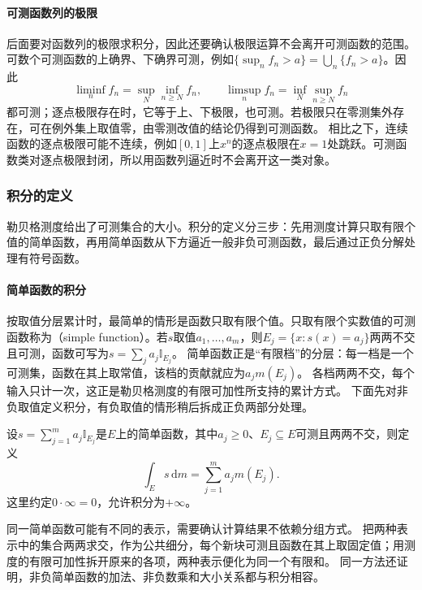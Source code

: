 \paragraph{可测函数列的极限}
后面要对函数列的极限求积分，因此还要确认极限运算不会离开可测函数的范围。
可数个可测函数的上确界、下确界可测，例如$\{\sup_nf_n>a\}=\bigcup_n\{f_n>a\}$。因此
\[
 \liminf_nf_n=\sup_N\inf_{n\geq N}f_n,\qquad
 \limsup_nf_n=\inf_N\sup_{n\geq N}f_n
\]
都可测；逐点极限存在时，它等于上、下极限，也可测。若极限只在零测集外存在，可在例外集上取值零，由零测改值的结论仍得到可测函数。
相比之下，连续函数的逐点极限可能不连续，例如$[0,1]$上$x^n$的逐点极限在$x=1$处跳跃。可测函数类对逐点极限封闭，所以用函数列逼近时不会离开这一类对象。

\subsubsection{积分的定义}

勒贝格测度给出了可测集合的大小。积分的定义分三步：先用测度计算只取有限个值的简单函数，再用简单函数从下方逼近一般非负可测函数，最后通过正负分解处理有符号函数。


\paragraph{简单函数的积分}
按取值分层累计时，最简单的情形是函数只取有限个值。只取有限个实数值的可测函数称为（simple function）。若$s$取值$a_1,\ldots,a_m$，则$E_j=\{x:s(x)=a_j\}$两两不交且可测，函数可写为$s=\sum_ja_j\mathbb I_{E_j}$。
简单函数正是“有限档”的分层：每一档是一个可测集，函数在其上取常值，该档的贡献就应为$a_jm(E_j)$。
各档两两不交，每个输入只计一次，这正是勒贝格测度的有限可加性所支持的累计方式。
下面先对非负取值定义积分，有负取值的情形稍后拆成正负两部分处理。
\begin{definition}[非负简单函数的积分]
\label{def:analysis-simple-function-integral}
设$s=\sum_{j=1}^m a_j\mathbb I_{E_j}$是$E$上的简单函数，其中$a_j\geq0$、$E_j\subseteq E$可测且两两不交，则定义
\begin{equation}
 \int_Es\,\mathrm dm=\sum_{j=1}^m a_jm(E_j).
\label{eq:analysis-simple-integral}
\end{equation}
这里约定$0\cdot\infty=0$，允许积分为$+\infty$。
\end{definition}
同一简单函数可能有不同的表示，需要确认计算结果不依赖分组方式。
把两种表示中的集合两两求交，作为公共细分，每个新块可测且函数在其上取固定值；用测度的有限可加性拆开原来的各项，两种表示便化为同一个有限和。
同一方法还证明，非负简单函数的加法、非负数乘和大小关系都与积分相容。

